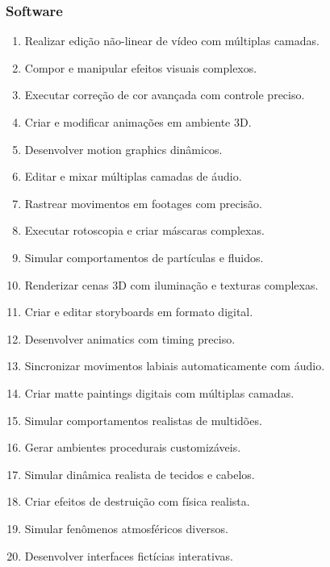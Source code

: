 \subsubsection{Software}
\begin{enumerate}
  \item Realizar edição não-linear de vídeo com múltiplas camadas.
  \item Compor e manipular efeitos visuais complexos.
  \item Executar correção de cor avançada com controle preciso.
  \item Criar e modificar animações em ambiente 3D.
  \item Desenvolver motion graphics dinâmicos.
  \item Editar e mixar múltiplas camadas de áudio.
  \item Rastrear movimentos em footages com precisão.
  \item Executar rotoscopia e criar máscaras complexas.
  \item Simular comportamentos de partículas e fluidos.
  \item Renderizar cenas 3D com iluminação e texturas complexas.
  \item Criar e editar storyboards em formato digital.
  \item Desenvolver animatics com timing preciso.
  \item Sincronizar movimentos labiais automaticamente com áudio.
  \item Criar matte paintings digitais com múltiplas camadas.
  \item Simular comportamentos realistas de multidões.
  \item Gerar ambientes procedurais customizáveis.
  \item Simular dinâmica realista de tecidos e cabelos.
  \item Criar efeitos de destruição com física realista.
  \item Simular fenômenos atmosféricos diversos.
  \item Desenvolver interfaces fictícias interativas.
\end{enumerate}

